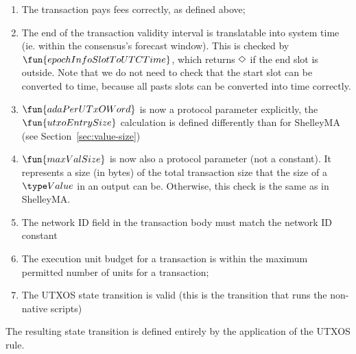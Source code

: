 \begin{enumerate}
  \item The transaction pays fees correctly, as defined above;

  \item The end of the transaction validity interval is translatable into
  system time (ie. within the consensus's forecast window). This is checked
  by $\fun{epochInfoSlotToUTCTime}$, which returns $\Diamond$ if the end slot is outside.
  Note that we do not need to check that the start slot can be converted to
  time, because all pasts slots can be converted into time correctly.

  \item $\fun{adaPerUTxOWord}$ is now a protocol parameter explicitly, the
  $\fun{utxoEntrySize}$ calculation is defined differently than for ShelleyMA
  (see Section~\ref{sec:value-size})

  \item $\fun{maxValSize}$ is now also a protocol parameter (not a constant).
  It represents a size (in bytes) of the total transaction
  size that the size of a $\Value$ in an output can be. Otherwise, this check is
  the same as in ShelleyMA.

  \item The network ID field in the transaction body must match the
  network ID constant 

 \item The execution unit budget for a transaction is within the maximum
  permitted number of units for a transaction;

  \item The UTXOS state transition is valid (this is the transition that runs the
  non-native scripts)
\end{enumerate}

The resulting state transition is defined entirely by the application of the
UTXOS rule.

